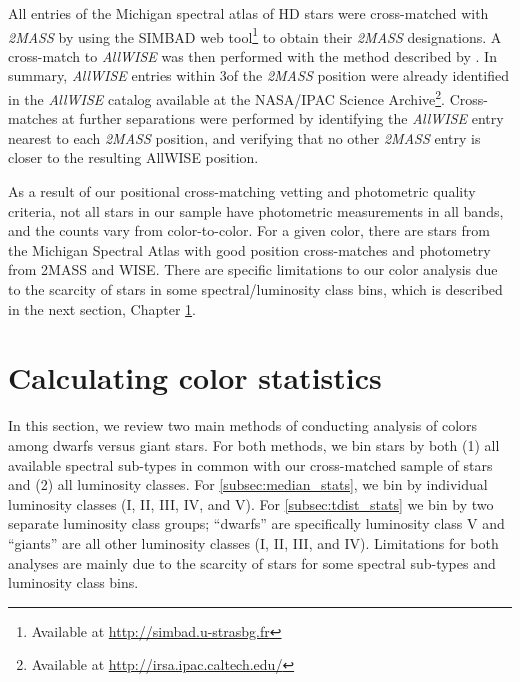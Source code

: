 All entries of the Michigan spectral atlas of HD stars were cross-matched with \textit{2MASS} \citep{Skrutskie2006} by using the SIMBAD web tool\footnote{Available at \url{http://simbad.u-strasbg.fr}} to obtain their \textit{2MASS} designations. A cross-match to \textit{AllWISE} \cite{ALLWISE,ALLWISE-dwarfs} was then performed with the method described by \cite{BANYAN}. In summary, \textit{AllWISE} entries within 3\arcsec of the \textit{2MASS} position were already identified in the \textit{AllWISE} catalog available at the NASA/IPAC Science Archive\footnote{Available at \url{http://irsa.ipac.caltech.edu/}}. Cross-matches at further separations were performed by identifying the \textit{AllWISE} entry nearest to each \textit{2MASS} position, and verifying that no other \textit{2MASS} entry is closer to the resulting AllWISE position.

As a result of our positional cross-matching vetting and photometric quality criteria, not all stars in our sample have photometric measurements in all bands, and the counts vary from color-to-color. For a given color, there are \bincount stars from the Michigan Spectral Atlas with good position cross-matches and photometry from 2MASS and WISE. There are specific limitations to our color analysis due to the scarcity of stars in some spectral/luminosity class bins, which is described in the next section, Chapter \ref{sec:color_stats}.

\section{Calculating color statistics} \label{sec:color_stats}
In this section, we review two main methods of conducting analysis of colors among dwarfs versus giant stars. For both methods, we bin stars by both (1) all available spectral sub-types in common with our cross-matched sample of \bincount stars and (2) all luminosity classes. For \ref{subsec:median_stats}, we bin by individual luminosity classes (I, II, III, IV, and V). For \ref{subsec:tdist_stats} we bin by two separate luminosity class groups; ``dwarfs'' are specifically luminosity class V and ``giants'' are all other luminosity classes (I, II, III, and IV). Limitations for both analyses are mainly due to the scarcity of stars for some spectral sub-types and luminosity class bins. 

